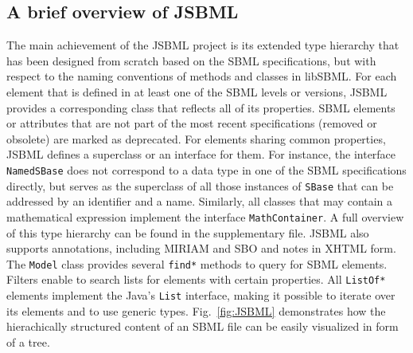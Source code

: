 \documentclass{bioinfo}
\begin{document}
\begin{methods}
\section{A brief overview of JSBML}

The main achievement of the JSBML project is its extended type hierarchy that has been designed 
from scratch based on the SBML specifications, but with respect to the naming conventions of
methods and classes in libSBML. For each element that is defined in at least one of the SBML levels 
or versions, JSBML provides a corresponding class that reflects all of its
properties. SBML elements or attributes that are not part of the most 
recent specifications (removed or obsolete) are marked as deprecated. For
elements sharing common properties, JSBML defines a superclass or an interface
for them. For instance, the interface \texttt{NamedSBase} does not correspond to a 
data type in one of the SBML specifications directly, but serves as the
superclass of all those instances of \texttt{SBase} that can be addressed by an identifier and
a name. Similarly, all classes that may contain a mathematical expression implement the 
interface \texttt{MathContainer}. A full overview of this type hierarchy can be found in the supplementary
file. JSBML also supports annotations, including MIRIAM \citep{Novere2005} and
SBO \citep{Novere2006b, Holland2008}
and notes in XHTML form.
The \texttt{Model} class provides several \texttt{find*}
methods to query for SBML elements. Filters enable to search lists for elements with certain properties. 
All \texttt{ListOf*} elements implement the Java's \texttt{List} interface,
making it possible to iterate over its elements and to use generic types.
Fig.~\ref{fig:JSBML} demonstrates how the hierachically structured content of an SBML file 
can be easily visualized in form of a tree.
\begin{figure}
\centerline{
  }
\end{figure}
\end{methods}
\end{document}
